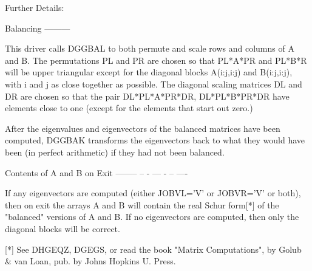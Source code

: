 \begin{DoxyParagraph}{Further Details\+: }
\begin{DoxyVerb}  Balancing
  ---------

  This driver calls DGGBAL to both permute and scale rows and columns
  of A and B.  The permutations PL and PR are chosen so that PL*A*PR
  and PL*B*R will be upper triangular except for the diagonal blocks
  A(i:j,i:j) and B(i:j,i:j), with i and j as close together as
  possible.  The diagonal scaling matrices DL and DR are chosen so
  that the pair  DL*PL*A*PR*DR, DL*PL*B*PR*DR have elements close to
  one (except for the elements that start out zero.)

  After the eigenvalues and eigenvectors of the balanced matrices
  have been computed, DGGBAK transforms the eigenvectors back to what
  they would have been (in perfect arithmetic) if they had not been
  balanced.

  Contents of A and B on Exit
  -------- -- - --- - -- ----

  If any eigenvectors are computed (either JOBVL='V' or JOBVR='V' or
  both), then on exit the arrays A and B will contain the real Schur
  form[*] of the "balanced" versions of A and B.  If no eigenvectors
  are computed, then only the diagonal blocks will be correct.

  [*] See DHGEQZ, DGEGS, or read the book "Matrix Computations",
      by Golub & van Loan, pub. by Johns Hopkins U. Press.\end{DoxyVerb}
 
\end{DoxyParagraph}
\hypertarget{group__doubleGEeigen_ga8637d4b822e19d10327ddcb4235dc08e}{}
